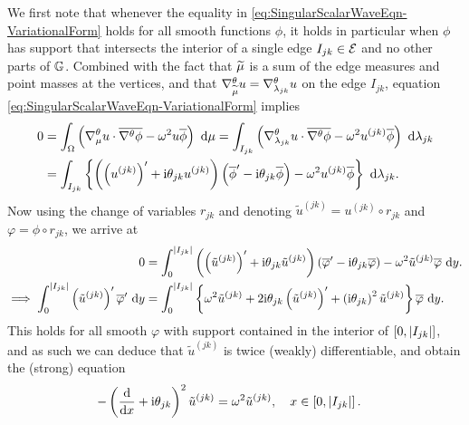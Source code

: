 We first note that whenever the equality in \eqref{eq:SingularScalarWaveEqn-VariationalForm} holds for all smooth functions $\phi$, it holds in particular when $\phi$ has support that intersects the interior of a single edge $I_{jk}\in\mathcal{E}$ and no other parts of $\mathbb{G}$.
Combined with the fact that $\widetilde{\mu}$ is a sum of the edge measures and point masses at the vertices, and that $\nabla^{\theta}_{\widetilde{\mu}}u=\nabla^{\theta}_{\lambda_{jk}}u$ on the edge $I_{jk}$, equation \eqref{eq:SingularScalarWaveEqn-VariationalForm} implies
\begin{align*}
	0 &= \int_{\Omega} \left( \nabla^{\theta}_\mu u \cdot \overline{\nabla^{\theta}\phi} - \omega^2 u\overline{\phi} \right)  \ \mathrm{d}\mu
	= \int_{I_{jk}} \left( \nabla^{\theta}_{\lambda_{jk}}u \cdot \overline{\nabla^{\theta}\phi} - \omega^2 u^{(jk)}\overline{\phi} \right)  \ \mathrm{d}\lambda_{jk} \\
	&= \int_{I_{jk}} \left\{  \left( \left( u^{(jk)} \right)' + \mathrm{i}\theta_{jk} u^{(jk)} \right)\left( \overline{\phi}' - \mathrm{i}\theta_{jk} \overline{\phi}  \right) - \omega^2 u^{(jk)}\overline{\phi}  \right\}  \ \mathrm{d}\lambda_{jk}.
\end{align*}
Now using the change of variables $r_{jk}$ and denoting $\tilde{u}^{(jk)} = u^{(jk)} \circ r_{jk}$ and $\varphi = \phi\circ r_{jk}$, we arrive at
\begin{align*}
	0 &= \int_{0}^{\left\lvert I_{jk} \right\rvert} \left( \left( \tilde{u}^{(jk)} \right)' + \mathrm{i}\theta_{jk} \tilde{u}^{(jk)} \right)\left( \overline{\varphi}' - \mathrm{i}\theta_{jk} \overline{\varphi}  \right) - \omega^2 \tilde{u}^{(jk)}\overline{\varphi} \ \mathrm{d} y. \\
	\implies
	\int_{0}^{\left\lvert I_{jk} \right\rvert} \left( \tilde{u}^{(jk)} \right)'\overline{\varphi}' \ \mathrm{d} y &=
	\int_{0}^{\left\lvert I_{jk} \right\rvert} \left\{  \omega^2\tilde{u}^{(jk)} + 2\mathrm{i}\theta_{jk}\left( \tilde{u}^{(jk)} \right)' + \left( \mathrm{i}\theta_{jk} \right)^2\tilde{u}^{(jk)}  \right\} \overline{\varphi} \ \mathrm{d} y.
\end{align*}
This holds for all smooth $\varphi$ with support contained in the interior of $\left[ 0,\left\lvert I_{jk} \right\rvert \right]$, and as such we can deduce that $\tilde{u}^{(jk)}$ is twice (weakly) differentiable, and obtain the (strong) equation
\begin{align*}
	-\left( \dfrac{\mathrm{d}}{\mathrm{d}x} + \mathrm{i}\theta_{jk} \right)^2 \tilde{u}^{(jk)} &= \omega^2 \tilde{u}^{(jk)}, \quad x\in\left[ 0,\left\lvert I_{jk} \right\rvert \right].
\end{align*}


